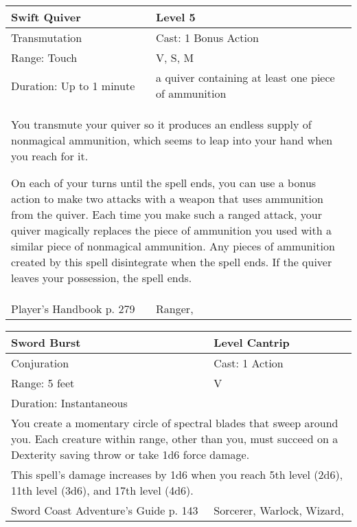 \documentclass[11pt]{report}
\begin{document}
\begin{table}[H]
	\begin{tabular}{||p{6cm}|p{6cm}||}
		\hline\hline
		\bf{Swift Quiver} & Level 5\\ \hline
		Transmutation & Cast: 1 Bonus Action\\ \hline
		Range: Touch & V, S, M\\ \hline
		Duration: Up to 1 minute & a quiver containing at least one piece of ammunition\\ \hline
		\multicolumn{2}{||p{12cm}||}{You transmute your quiver so it produces an endless supply of nonmagical ammunition, which seems to leap into your hand when you reach for it.

On each of your turns until the spell ends, you can use a bonus action to make two attacks with a weapon that uses ammunition from the quiver. Each time you make such a ranged attack, your quiver magically replaces the piece of ammunition you used with a similar piece of nonmagical ammunition. Any pieces of ammunition created by this spell disintegrate when the spell ends. If the quiver leaves your possession, the spell ends.}\\ \hline
Player's Handbook p. 279 & Ranger, \\ \hline\hline
	\end{tabular}
\end{table}

\begin{table}[H]
	\begin{tabular}{||p{6cm}|p{6cm}||}
		\hline\hline
		\bf{Sword Burst} & Level Cantrip\\ \hline
		Conjuration & Cast: 1 Action\\ \hline
		Range: 5 feet & V\\ \hline
		Duration: Instantaneous & \\ \hline
		\multicolumn{2}{||p{12cm}||}{You create a momentary circle of spectral blades that sweep around you.
Each creature within range, other than you, must succeed on a Dexterity saving throw or take 1d6 force damage.}\\ \hline
		\multicolumn{2}{||p{12cm}||}{This spell's damage increases by 1d6 when you reach 5th level (2d6), 11th level (3d6), and 17th level (4d6).}\\ \hline
Sword Coast Adventure's Guide p. 143 & Sorcerer, Warlock, Wizard, \\ \hline\hline
	\end{tabular}
\end{table}
\end{document}
